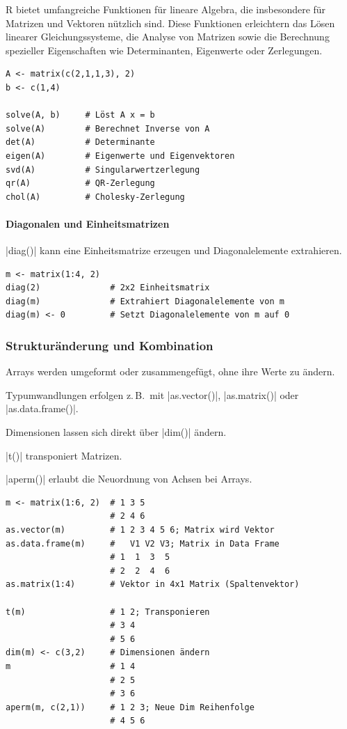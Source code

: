 \documentclass[10pt,twocolumn]{scrartcl}
\renewcommand{\lstinline}{\mycoloredinline}
\begin{document}
R bietet umfangreiche Funktionen für lineare Algebra, die insbesondere für Matrizen und Vektoren nützlich sind. Diese Funktionen erleichtern das Lösen linearer Gleichungssysteme, die Analyse von Matrizen sowie die Berechnung spezieller Eigenschaften wie Determinanten, Eigenwerte oder Zerlegungen.  

\begin{lstlisting}
A <- matrix(c(2,1,1,3), 2)
b <- c(1,4)

solve(A, b)     # Löst A x = b
solve(A)        # Berechnet Inverse von A
det(A)          # Determinante
eigen(A)        # Eigenwerte und Eigenvektoren
svd(A)          # Singularwertzerlegung
qr(A)           # QR-Zerlegung
chol(A)         # Cholesky-Zerlegung
\end{lstlisting}

\paragraph{Diagonalen und Einheitsmatrizen}

\lstinline|diag()| kann eine Einheitsmatrize erzeugen und Diagonalelemente extrahieren.

\begin{lstlisting}
m <- matrix(1:4, 2)
diag(2)              # 2x2 Einheitsmatrix
diag(m)              # Extrahiert Diagonalelemente von m
diag(m) <- 0         # Setzt Diagonalelemente von m auf 0
\end{lstlisting}


\subsubsection{Strukturänderung und Kombination}

Arrays werden umgeformt oder zusammengefügt, ohne ihre Werte zu ändern.

Typumwandlungen erfolgen z.\,B.\ mit \lstinline|as.vector()|, \lstinline|as.matrix()| oder \lstinline|as.data.frame()|.

Dimensionen lassen sich direkt über \lstinline|dim()| ändern.

\lstinline|t()| transponiert Matrizen.

\lstinline|aperm()| erlaubt die Neuordnung von Achsen bei Arrays. 

\begin{lstlisting}
m <- matrix(1:6, 2)  # 1 3 5
                     # 2 4 6
as.vector(m)         # 1 2 3 4 5 6; Matrix wird Vektor
as.data.frame(m)     #   V1 V2 V3; Matrix in Data Frame
                     # 1  1  3  5
                     # 2  2  4  6
as.matrix(1:4)       # Vektor in 4x1 Matrix (Spaltenvektor)

t(m)                 # 1 2; Transponieren
                     # 3 4
                     # 5 6
dim(m) <- c(3,2)     # Dimensionen ändern
m                    # 1 4
                     # 2 5
                     # 3 6
aperm(m, c(2,1))     # 1 2 3; Neue Dim Reihenfolge
                     # 4 5 6
\end{lstlisting}
\end{document}
